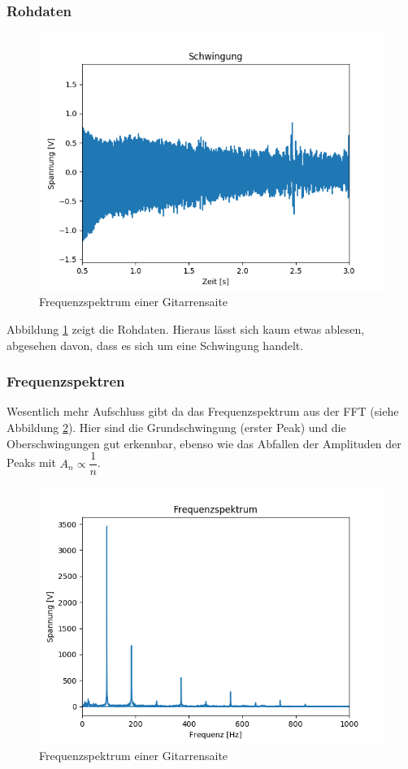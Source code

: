 \documentclass[12pt,a4paper]{article}
\begin{document}
\subsubsection{Rohdaten}
\begin{figure}
\includegraphics[scale=1]{Bilder/Gitarre_Schwingung.png}
\centering
\caption{Frequenzspektrum einer Gitarrensaite}
\label{Schwingung_Rohdaten}
\end{figure}
Abbildung \ref{Schwingung_Rohdaten} zeigt die Rohdaten. Hieraus lässt sich kaum etwas ablesen, abgesehen davon, dass es sich um eine Schwingung handelt.
\subsubsection{Frequenzspektren}
Wesentlich mehr Aufschluss gibt da das Frequenzspektrum aus der FFT (siehe Abbildung \ref{Saite_Frequenzspektrum}). Hier sind die Grundschwingung (erster Peak) und die Oberschwingungen gut erkennbar, ebenso wie das Abfallen der Amplituden der Peaks mit $A_n \propto \dfrac{1}{n}$.
\begin{figure}
\includegraphics[scale=1]{Bilder/FrequenzspektrumGitarrensaite.png}
\centering
\caption{Frequenzspektrum einer Gitarrensaite}
\label{Saite_Frequenzspektrum}
\end{figure}
\end{document}
